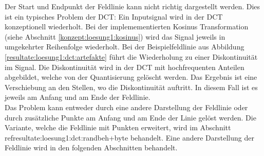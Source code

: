 Der Start und Endpunkt der Feldlinie kann nicht richtig dargestellt werden. Dies ist ein typisches Problem der DCT: Ein Inputsignal wird in der DCT konzeptionell wiederholt. Bei der implemementierten Kosinus Transformation (siehe Abschnitt \ref{konzept:loesung1:kosinus}) wird das Signal jeweils in umgekehrter Reihenfolge wiederholt. Bei der Beispielfeldlinie aus Abbildung \ref{resultate:loesung1:dct:artefakte} führt die Wiederholung zu einer Diskontinuität im Signal. Die Diskontinuität wird in der DCT mit hochfrequenten Anteilen abgebildet, welche von der Quantisierung gelöscht werden. Das Ergebnis ist eine Verschiebung an den Stellen, wo die Diskontinuität auftritt. In diesem Fall ist es jeweils am Anfang und am Ende der Feldlinie.\\
Das Problem kann entweder durch eine andere Darstellung der Feldlinie oder durch zusätzliche Punkte am Anfang und am Ende der Linie gelöst werden. Die Variante, welche die Feldlinie mit Punkten erweitert, wird im Abschnitt ref{resultate:loesung1:dct:randbeh+byte} behandelt. Eine andere Darstellung der Feldlinie wird in den folgenden Abschnitten behandelt.

